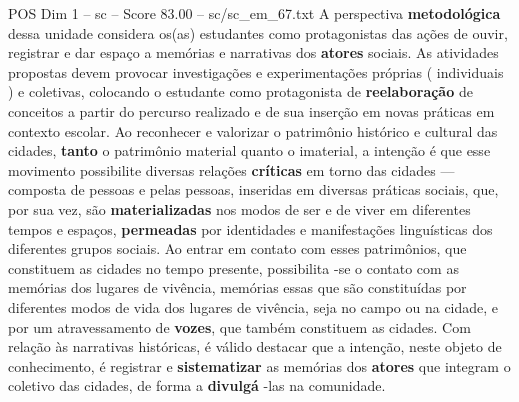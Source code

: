\begin{textsample}{POS Dim 1 – sc – Score 83.00 – sc/sc\_em\_67.txt}
A perspectiva \textbf{metodológica} dessa unidade considera os(as) estudantes como protagonistas das ações de ouvir, registrar e dar espaço a memórias e narrativas dos \textbf{atores} sociais.
As atividades propostas devem provocar investigações e experimentações próprias ( individuais ) e coletivas, colocando o estudante como protagonista de \textbf{reelaboração} de conceitos a partir do percurso realizado e de sua inserção em novas práticas em contexto escolar.
Ao reconhecer e valorizar o patrimônio histórico e cultural das cidades, \textbf{tanto} o patrimônio material quanto o imaterial, a intenção é que esse movimento possibilite diversas relações \textbf{críticas} em torno das cidades — composta de pessoas e pelas pessoas, inseridas em diversas práticas sociais, que, por sua vez, são \textbf{materializadas} nos modos de ser e de viver em diferentes tempos e espaços, \textbf{permeadas} por identidades e manifestações linguísticas dos diferentes grupos sociais.
Ao entrar em contato com esses patrimônios, que constituem as cidades no tempo presente, possibilita -se o contato com as memórias dos lugares de vivência, memórias essas que são constituídas por diferentes modos de vida dos lugares de vivência, seja no campo ou na cidade, e por um atravessamento de \textbf{vozes}, que também constituem as cidades.
Com relação às narrativas históricas, é válido destacar que a intenção, neste objeto de conhecimento, é registrar e \textbf{sistematizar} as memórias dos \textbf{atores} que integram o coletivo das cidades, de forma a \textbf{divulgá} -las na comunidade.

\end{textsample}
